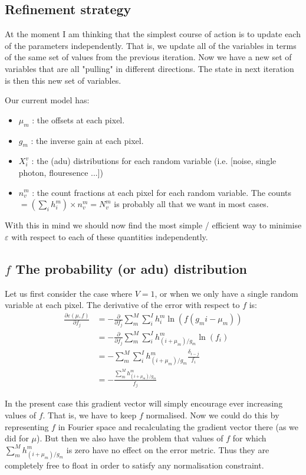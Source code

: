 \documentclass[11pt]{article}
\begin{document}
\subsection{Refinement strategy}
At the moment I am thinking that the simplest course of action is to update each of the parameters independently. That is, we update all of the variables in terms of the same set of values from the previous iteration. Now we have a new set of variables that are all "pulling" in different directions. The state in next iteration is then this new set of variables.

Our current model has:
\begin{itemize}
  \item $\mu_m$ : the offsets at each pixel.
  \item $g_m$   : the inverse gain at each pixel.
  \item $X^v_i$ : the (adu) distributions for each random variable (i.e. [noise, single photon, flouresence ...])
  \item $n^m_v$ : the count fractions at each pixel for each random variable. The counts $= (\sum_i h^m_i) \times n^m_v = N^m_v$ is probably all that we want in most cases.
\end{itemize}

With this in mind we should now find the most simple / efficient way to minimise $\varepsilon$ with respect to each of these quantities independently. 


\subsection{$f$ The probability (or adu) distribution}
Let us first consider the case where $V=1$, or when we only have a single random variable at each pixel. The derivative of the error with respect to $f$ is:
\begin{align}
   \frac{\partial \varepsilon(\mu, f)}{\partial f_j} &= -\frac{\partial}{\partial f_j} \sum_m^M \sum_i^I h^m_i \ln(f(g_mi - \mu_m)) \\
   &= -\frac{\partial}{\partial f_j} \sum_m^M \sum_i^I h^m_{(i+\mu_m)/g_m} \ln(f_i) \\
   &= -\sum_m^M \sum_i^I h^m_{(i+\mu_m)/g_m} \frac{\delta_{i-j}}{f_i} \\
   &= -\frac{\sum_m^M h^m_{(i+\mu_m)/g_m}}{f_j}
\end{align}

In the present case this gradient vector will simply encourage ever increasing values of $f$. That is, we have to keep $f$ normalised. Now we could do this by representing $f$ in Fourier space and recalculating the gradient vector there (as we did for $\mu$). But then we also have the problem that values of $f$ for which $\sum_m^M h^m_{(i+\mu_m)/g_m}$ is zero have no effect on the error metric. Thus they are completely free to float in order to satisfy any normalisation constraint.
\end{document}
